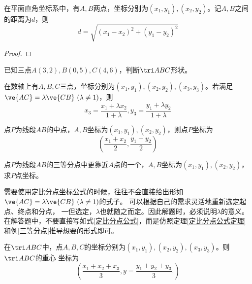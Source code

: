 \begin{theorem}[两点之间距离公式]
    在平面直角坐标系中，有\(A,B\)两点，坐标分别为\((x_1,y_1),(x_2,y_2)\)。记\(A,B\)之间的距离为\(d\)，则
    \begin{equation}
        d=\sqrt{(x_1-x_2)^2+(y_1-y_2)^2}
    \end{equation}
\end{theorem}
\begin{proof}
    
\end{proof}
\begin{exercise}
    已知三点\(A(3,2),B(0,5),C(4,6)\)，判断\(\tri ABC\)形状。
\end{exercise}



\begin{theorem}
    在数轴上有\(A,B,C\)三点，坐标分别为\((x_1,y_1),(x_2,y_2),(x_3,y_3)\)。若满足\(\ve{AC}=\lambda\ve{CB} \ (\lambda\neq 1)\)，则
    \begin{equation}
        x_3=\frac{x_{1}+\lambda x_{2}}{1+\lambda}, y_3=\frac{y_{1}+\lambda y_{2}}{1+\lambda}
    \end{equation}
\end{theorem}
\begin{corollary}\label{定比分点公式定理}
    点\(P\)为线段\(AB\)的中点，\(A,B\)坐标为$(x_1,y_1),(x_2,y_2)$，则点\(P\)坐标为
    \begin{equation}\label{定比分点公式}
        \left(\frac{x_{1}+x_{2}}{2}, \frac{y_{1}+y_{2}}{2}\right)
    \end{equation}
\end{corollary}
\begin{example}\label{三等分点}
    点\(P\)为线段\(AB\)的三等分点中更靠近\(A\)点的一个，\(A,B\)坐标为$(x_1,y_1),(x_2,y_2)$，
    求\(P\)点坐标。
\end{example}

需要使用定比分点坐标公式的时候，往往不会直接给出形如\(\ve{AC}=\lambda\ve{CB} \ (\lambda\neq 1)\)的式子。
可以根据自己的需求灵活地重新选定起点、终点和分点，
一但选定，\(\lambda\)也就随之而定。因此解题时，必须说明\(\lambda\)的意义。
在解答题中，不要直接写如式\ref{定比分点公式}，而是仿照定理\ref{定比分点公式定理}和例\ref{三等分点}推导想要的形式即可。

\begin{theorem}
    在\(\tri ABC\)中，点\(A,B,C\)的坐标分别为\((x_1,y_1),(x_2,y_2),(x_3,y_3)\)。则\(\tri ABC\)的重心
    坐标为
    \begin{equation}
        \left(\frac{x_{1}+x_{2}+x_{3}}{3},  y=\frac{y_{1}+y_{2}+y_{3}}{3} .\right)
    \end{equation}
\end{theorem}

